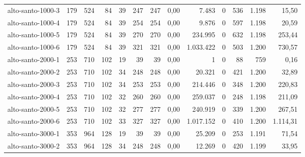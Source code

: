 \begin{table}[ht!]
{\begin{tabular}{lrrrrrrrrrrrr}
			\rowcolor{rowgrey}alto-santo-1000-3                                                      & 179   & 524   & 84  & 39 & 247 & 247 & 0,00  & 7.483     & 0 & 536    & 1.198 & 15,50    \\
			\rowcolor{rowgrey}alto-santo-1000-4                                                      & 179   & 524   & 84  & 39 & 254 & 254 & 0,00  & 9.876     & 0 & 597    & 1.198 & 20,59    \\
			\rowcolor{rowgrey}alto-santo-1000-5                                                      & 179   & 524   & 84  & 39 & 270 & 270 & 0,00  & 234.995   & 0 & 632    & 1.198 & 253,44   \\
			\rowcolor{rowgrey}alto-santo-1000-6                                                      & 179   & 524   & 84  & 39 & 321 & 321 & 0,00  & 1.033.422 & 0 & 503    & 1.200 & 730,57   \\
			\rowcolor{rowgrey}alto-santo-2000-1                                                      & 253   & 710   & 102 & 19 & 39  & 39  & 0,00  & 1         & 0 & 88     & 759   & 0,16     \\
			\rowcolor{rowgrey}alto-santo-2000-2                                                      & 253   & 710   & 102 & 34 & 248 & 248 & 0,00  & 20.321    & 0 & 421    & 1.200 & 32,89    \\
			\rowcolor{rowgrey}alto-santo-2000-3                                                      & 253   & 710   & 102 & 34 & 253 & 253 & 0,00  & 214.446   & 0 & 348    & 1.200 & 220,83   \\
			\rowcolor{rowgrey}alto-santo-2000-4                                                      & 253   & 710   & 102 & 32 & 260 & 260 & 0,00  & 259.037   & 0 & 248    & 1.198 & 211,09   \\
			\rowcolor{rowgrey}alto-santo-2000-5                                                      & 253   & 710   & 102 & 32 & 277 & 277 & 0,00  & 240.919   & 0 & 339    & 1.200 & 267,51   \\
			\rowcolor{rowgrey}alto-santo-2000-6                                                      & 253   & 710   & 102 & 33 & 327 & 327 & 0,00  & 1.017.152 & 0 & 410    & 1.200 & 1.114,31 \\
			\rowcolor{rowgrey}alto-santo-3000-1                                                      & 353   & 964   & 128 & 19 & 39  & 39  & 0,00  & 25.209    & 0 & 253    & 1.191 & 71,54    \\
			\rowcolor{rowgrey}alto-santo-3000-2                                                      & 353   & 964   & 128 & 34 & 248 & 248 & 0,00  & 12.269    & 0 & 420    & 1.199 & 33,95    \\

\end{tabular}}
\end{table}
